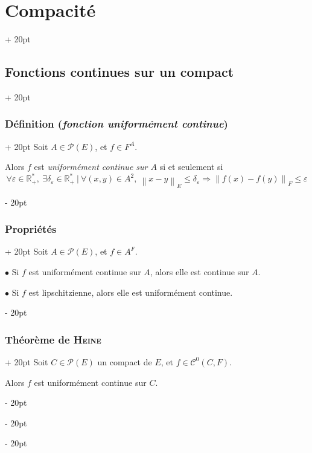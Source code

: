 \documentclass[a4paper, 12pt, twoside]{article}
\newcommand{\R}{\mathbb{R}} %
\newcommand{\norm}[1]{\left\lVert #1 \right\rVert}
\renewcommand{\le}{\leqslant}
\newcommand{\ind}[1][20pt]{\advance\leftskip + #1}
\newcommand{\deind}[1][20pt]{\advance\leftskip - #1}
\newenvironment{indt}[2][20pt]{#2 \par \ind[#1]}{\par \deind} %
\begin{document}
\begin{indt}{\section{Compacité}}
\begin{indt}{\subsection{Fonctions continues sur un compact}}
            \vspace{12pt}
            
            \begin{indt}{\subsubsection{Définition (\textit{fonction uniformément continue})}}
                Soit $A \in \mathcal P(E)$, et $f \in F^A$.

                Alors $f$ est \emph{uniformément continue sur $A$} si et seulement si
                \[
                    \forall \varepsilon \in \R^*_+,\
                    \exists \delta_\varepsilon \in \R^*_+\ |\
                    \forall (x, y) \in A^2,\
                    \norm{x - y}_E \le \delta_\varepsilon \Rightarrow \norm{f(x) - f(y)}_F \le \varepsilon
                \]
            \end{indt}

            \vspace{12pt}
            
            \begin{indt}{\subsubsection{Propriétés}}
                Soit $A \in \mathcal P(E)$, et $f \in A^F$.

                \vspace{6pt}
                
                $\bullet$ Si $f$ est uniformément continue sur $A$, alors elle est continue sur $A$.

                \vspace{6pt}
                
                $\bullet$ Si $f$ est lipschitzienne, alors elle est uniformément continue.
            \end{indt}

            \vspace{12pt}
            
            \begin{indt}{\subsubsection{Théorème de \textsc{Heine}}}
                Soit $C \in \mathcal P(E)$ un compact de $E$, et $f \in \mathcal C^0(C, F)$.

                \vspace{6pt}
                
                Alors $f$ est uniformément continue sur $C$.
            \end{indt}
        \end{indt}
    \end{indt}
\end{document}
